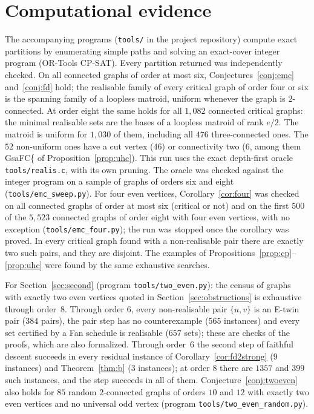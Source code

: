\documentclass[11pt]{amsart}
\theoremstyle{definition}
\begin{document}
\section{Computational evidence}\label{app:comp}

The accompanying programs (\texttt{tools/} in the project repository) compute exact partitions by
enumerating simple paths and solving an exact-cover integer program (OR-Tools CP-SAT). Every
partition returned was independently checked. On all connected graphs of order at most six,
Conjectures~\ref{conj:emc} and~\ref{conj:fd} hold; the realisable family of every critical graph of
order four or six is the spanning family of a loopless matroid, uniform whenever the graph is
$2$-connected. At order eight the same holds for all $1{,}082$ connected critical graphs: the
minimal realisable sets are the bases of a loopless matroid of rank $e/2$. The matroid is uniform for
$1{,}030$ of them, including all $476$ three-connected ones. The $52$ non-uniform ones have a cut
vertex ($46$) or connectivity two ($6$, among them GsaFC\{ of Proposition~\ref{prop:uhc}). This run
uses the exact depth-first oracle \texttt{tools/realis.c}, with its own pruning. The oracle was checked
against the integer program on a sample of graphs of orders six and eight (\texttt{tools/emc\_sweep.py}). For four even vertices, Corollary~\ref{cor:four} was checked
on all connected graphs of order at most six (critical or not) and on the first 500 of the $5{,}523$
connected graphs of order eight with four even vertices, with no exception (\texttt{tools/emc\_four.py});
the run was stopped once the corollary was proved. In every critical graph found with a non-realisable
pair there are exactly two such pairs, and they are disjoint. The examples of Propositions~\ref{prop:cp}--\ref{prop:uhc}
were found by the same exhaustive searches.

For Section~\ref{sec:second} (program \texttt{tools/two\_even.py}): the census of graphs with
exactly two even vertices quoted in Section~\ref{sec:obstructions} is exhaustive through order~$8$.
Through order $6$, every non-realisable pair $\{u,v\}$ is an E-twin pair ($384$ pairs), the pair
step has no counterexample ($565$ instances) and every set certified by a Fan schedule is
realisable ($657$ sets); these are checks of the proofs, which are also formalized. Through
order~$6$ the second step of faithful descent succeeds in every residual instance of
Corollary~\ref{cor:fd2strong} ($9$ instances) and Theorem~\ref{thm:b} ($3$ instances); at order
$8$ there are $1357$ and $399$ such instances, and the step succeeds in all of them.
Conjecture~\ref{conj:twoeven} also holds for $85$ random $2$-connected graphs of orders $10$ and
$12$ with exactly two even vertices and no universal odd vertex (program
\texttt{tools/two\_even\_random.py}).
\end{document}

